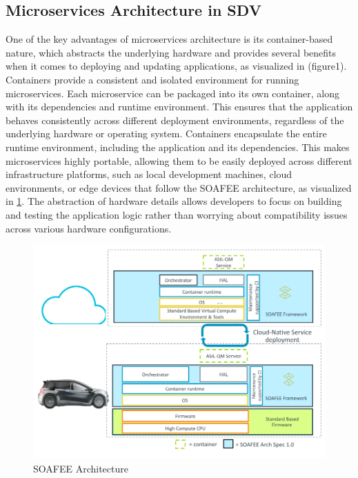 \documentclass[
12pt,
oneside, 
onehalfspacing, 
nolistspacing, 
parskip, 
chapterinoneline, 
]{AASTCOMPUTER}
\begin{document}
\subsection{Microservices Architecture in SDV}
One of the key advantages of microservices architecture is its container-based nature, which abstracts the underlying hardware and provides several benefits when it comes to deploying and updating applications, as visualized in (figure1). Containers provide a consistent and isolated environment for running microservices. Each microservice can be packaged into its own container, along with its dependencies and runtime environment. This ensures that the application behaves consistently across different deployment environments, regardless of the underlying hardware or operating system. Containers encapsulate the entire runtime environment, including the application and its dependencies. This makes microservices highly portable, allowing them to be easily deployed across different infrastructure platforms, such as local development machines, cloud environments, or edge devices that follow the SOAFEE architecture, as visualized in \ref{fig:SOAFEE Architecture}. The abstraction of hardware details allows developers to focus on building and testing the application logic rather than worrying about compatibility issues across various hardware configurations.
\begin{figure}[!ht]
\centering
\includegraphics[scale=0.4]{Figures/15.png}
\caption[SOAFEE Architecture]{SOAFEE Architecture}
\label{fig:SOAFEE Architecture}
\end{figure}

\clearpage
\end{document}
